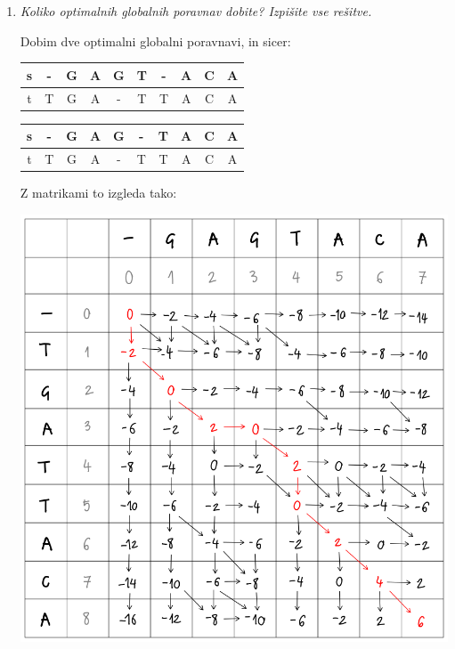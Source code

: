 \documentclass{article}
\begin{document}
\begin{enumerate}
\begin{enumerate}
			\item \textit{Koliko optimalnih globalnih poravnav dobite? Izpišite vse rešitve.}

				Dobim dve optimalni globalni poravnavi, in sicer:

				\begin{multicols}{2}
					\begin{tabular}{c||c|c|c|c|c|c|c|c|c}
						s & - & G & A & G & T & - & A & C & A \\
						\hline
						t & T & G & A & - & T & T & A & C & A
					\end{tabular}

					\begin{tabular}{c||c|c|c|c|c|c|c|c|c}
						s & - & G & A & G & - & T & A & C & A \\
						\hline
						t & T & G & A & - & T & T & A & C & A
					\end{tabular}
				\end{multicols}

				Z matrikami to izgleda tako:

				\begin{multicols}{2}
					\includegraphics[scale=0.25]{matrika-complete-2}

					\columnbreak


\end{multicols}
\end{enumerate}
\end{enumerate}
\end{document}
